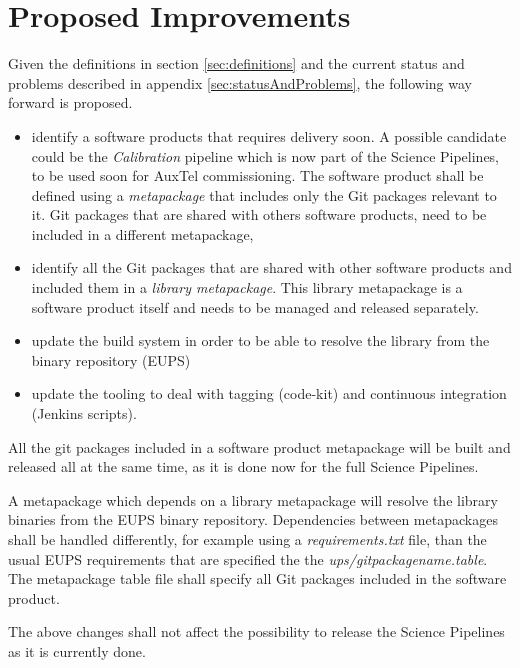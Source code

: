 \newpage
\section{Proposed Improvements}\label{sec:proimp}

Given the definitions in section \ref{sec:definitions} and the current status and problems described in appendix \ref{sec:statusAndProblems}, the following way forward is proposed.

\begin{itemize}
\item identify a software products that requires delivery soon.
A possible candidate could be the \textit{Calibration} pipeline which is now  part of the Science Pipelines, to be used soon for AuxTel commissioning.
The software product shall be defined using a \textit{metapackage} that includes only the Git packages relevant to it.
Git packages that are shared with others software products, need to be included in a different metapackage,
\item identify all the Git packages that are shared with other software products and included them in a \textit{library metapackage}.
This library metapackage is a software product itself and needs to be managed and released separately.
\item update the build system in order to be able to resolve the library from the binary repository (EUPS)
\item update the tooling to deal with tagging (code-kit) and continuous integration (Jenkins scripts).
\end{itemize}

All the git packages included in a software product metapackage will be built and released all at the same time, as it is done now for the full Science Pipelines.

A metapackage which depends on a library metapackage will resolve the library binaries from the EUPS binary repository.
Dependencies between metapackages shall be handled differently, for example using a \textit{requirements.txt} file, than the usual EUPS requirements that are specified the the \textit{ups/gitpackagename.table}.
The metapackage table file shall specify all Git packages included in the  software product.

The above changes shall not affect the possibility to release the Science Pipelines as it is currently done.

